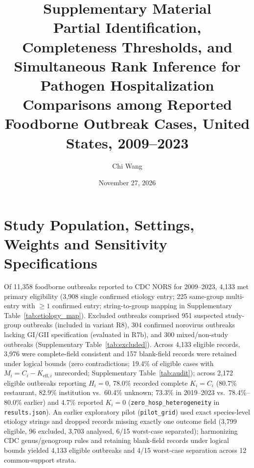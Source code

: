 \documentclass[11pt,a4paper]{article}
\title{\textbf{Supplementary Material}\\[0.4em]
\large Partial Identification, Completeness Thresholds, and Simultaneous Rank Inference for Pathogen Hospitalization Comparisons among Reported Foodborne Outbreak Cases, United States, 2009--2023}
\author{Chi Wang}
\date{November 27, 2026}
\begin{document}
\maketitle
\normalfont\mdseries

\section{Study Population, Settings, Weights and Sensitivity Specifications}\label{sec:s-population}

Of 11,358 foodborne outbreaks reported to CDC NORS for 2009--2023, 4,133 met primary eligibility (3,908 single confirmed etiology entry; 225 same-group multi-entry with $\ge 1$ confirmed entry; string-to-group mapping in Supplementary Table~\ref{tab:etiology_map}). Excluded outbreaks comprised 951 suspected study-group outbreaks (included in variant R8), 304 confirmed norovirus outbreaks lacking GI/GII specification (evaluated in R7b), and 300 mixed/non-study outbreaks (Supplementary Table~\ref{tab:excluded}). Across 4,133 eligible records, 3,976 were complete-field consistent and 157 blank-field records were retained under logical bounds (zero contradictions; 19.4\% of eligible cases with $M_i = C_i - K_{\text{eff},i}$ unrecorded; Supplementary Table~\ref{tab:audit}); across 2,172 eligible outbreaks reporting $H_i = 0$, 78.0\% recorded complete $K_i = C_i$ (80.7\% restaurant, 82.9\% institution vs.\ 60.4\% unknown; 73.3\% in 2019--2023 vs.\ 78.4\%--80.0\% earlier) and 4.7\% reported $K_i = 0$ (\texttt{zero\_hosp\_heterogeneity} in \texttt{results.json}). An earlier exploratory pilot (\texttt{pilot\_grid}) used exact species-level etiology strings and dropped records missing exactly one outcome field (3,799 eligible, 96 excluded, 3,703 analysed, 6/15 worst-case separated); harmonizing CDC genus/genogroup rules and retaining blank-field records under logical bounds yielded 4,133 eligible outbreaks and 4/15 worst-case separation across 12 common-support strata.
\end{document}
